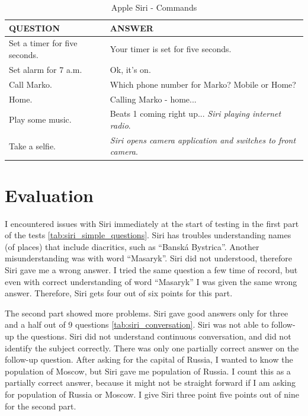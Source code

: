 \documentclass[
  digital, %
  oneside, %
  table,   %
  lof,     %
  lot,     %
]{fithesis3}
\begin{document}
\begin{table}[H]
    \begin{tabular}{ | p{6cm} | p{6cm} |} 
    \hline
    QUESTION & ANSWER \\
    \hline
    Set a timer for five seconds.
    & 
    Your timer is set for five seconds.
    \\
    \hline
    Set alarm for 7 a.m.
    &
    Ok, it's on.
    \\
    \hline
    Call Marko.
    &
    Which phone number for Marko? Mobile or Home?
    \\
    Home.
    &
    Calling Marko - home...
    \\
    \hline
    Play some music.
    &
    Beats 1 coming right up... \textit{Siri playing internet radio}.
    \\
    \hline
    Take a selfie.
    &
    \textit{Siri opens camera application and switches to front camera}.
    \\
    \hline
    \end{tabular}
    \caption{Apple Siri - Commands}
    \label{tab:siri_commands}
\end{table}

\section{Evaluation}

I encountered issues with Siri immediately at the start of testing in the first part of the tests \ref{tab:siri_simple_questions}. Siri has troubles understanding names (of places) that include diacritics, such as ``Banská Bystrica''. Another misunderstanding was with word ``Masaryk''. Siri did not understood, therefore Siri gave me a wrong answer. I tried the same question a few time of record, but even with correct understanding of word ``Masaryk'' I was given the same wrong answer. Therefore, Siri gets four out of six points for this part.

The second part showed more problems. Siri gave good answers only for three and a half out of 9 questions \ref{tab:siri_conversation}. Siri was not able to follow-up the questions. Siri did not understand continuous conversation, and did not identify the subject correctly. There was only one partially correct answer on the follow-up question. After asking for the capital of Russia, I wanted to know the population of Moscow, but Siri gave me population of Russia. I count this as a partially correct answer, because it might not be straight forward if I am asking for population of Russia or Moscow. I give Siri three point five points out of nine for the second part.
\end{document}
